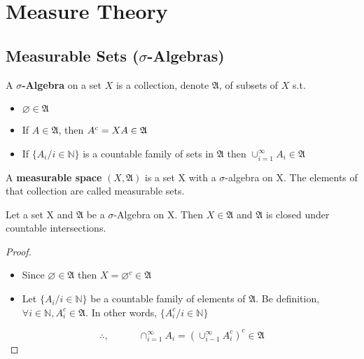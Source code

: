 \chapter{Measure Theory}
%
%
%
%


\section{Measurable Sets ($\sigma$-Algebras)}

\begin{leftbar}
\begin{define}
	A \textbf{$\sigma$-Algebra} on a set $X$ is a collection, denote $\mathfrak{A}$, of subsets of $X$ s.t.
	\begin{itemize}
		\item $ \varnothing \in \mathfrak{A}$
		\item If $A \in \mathfrak{A}$, then $A^{c}=X\\A\in\mathfrak{A}$
		\item If $\{A_{i}/i\in\mathbb{N}\}$ is a countable family of sets in $\mathfrak{A}$ then $\cup_{i=1}^{\infty}A_{i}\in\mathfrak{A}$
	\end{itemize}
\end{define}
\end{leftbar}

\begin{leftbar}
\begin{define}
	A \textbf{measurable space} $(X,\mathfrak{A})$ is a set X with a $\sigma$-algebra on X. The elements of that collection are called measurable sets.
\end{define}
\end{leftbar}


\begin{leftbar}
\begin{prop}
	Let a set X and $\mathfrak{A}$ be a $\sigma$-Algebra on X. Then $X\in\mathfrak{A}$ and $\mathfrak{A}$ is closed under countable intersections.
\end{prop}
\end{leftbar}

\begin{proof}
	\begin{itemize}
		\item Since $\varnothing \in \mathfrak{A}$ then $X=\varnothing^{c}\in\mathfrak{A}$
		\item Let $\{A_{i}/i\in\mathbb{N}\}$ be a countable family of elements of $\mathfrak{A}$. Be definition, $\forall i\in\mathbb{N}, A_{i}^{c}\in\mathfrak{A}$. In other words, $\{A_{i}^{c}/i\in\mathbb{N}\}$
	\end{itemize}
	\[\therefore,\hspace{3em} \cap_{i=1}^{\infty}A_{i}=(\cup_{i-1}^{\infty}A_{i}^{c})^{c}\in\mathfrak{A}\]
\end{proof}

